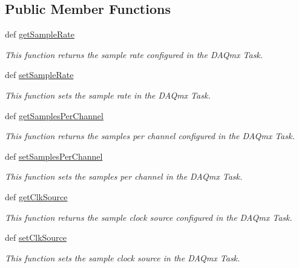 \subsection*{Public Member Functions}
\begin{DoxyCompactItemize}
\item 
def \hyperlink{class_chassis_8git_1_1_digital_output_1_1_digital_output_a514d7da1f494d60c8abc2591662de4f9}{get\-Sample\-Rate}
\begin{DoxyCompactList}\small\item\em This function returns the sample rate configured in the D\-A\-Qmx Task. \end{DoxyCompactList}\item 
def \hyperlink{class_chassis_8git_1_1_digital_output_1_1_digital_output_aedacbf4ed01d8c5ce2d33fb807c19859}{set\-Sample\-Rate}
\begin{DoxyCompactList}\small\item\em This function sets the sample rate in the D\-A\-Qmx Task. \end{DoxyCompactList}\item 
def \hyperlink{class_chassis_8git_1_1_digital_output_1_1_digital_output_a9dabf4d6ff1f1f59e7829efea80a2512}{get\-Samples\-Per\-Channel}
\begin{DoxyCompactList}\small\item\em This function returns the samples per channel configured in the D\-A\-Qmx Task. \end{DoxyCompactList}\item 
def \hyperlink{class_chassis_8git_1_1_digital_output_1_1_digital_output_ac3f88d2f34642621ba2d485174e8e3ad}{set\-Samples\-Per\-Channel}
\begin{DoxyCompactList}\small\item\em This function sets the samples per channel in the D\-A\-Qmx Task. \end{DoxyCompactList}\item 
def \hyperlink{class_chassis_8git_1_1_digital_output_1_1_digital_output_acc51d4045f6c8cbf5825dc4cf1dfc459}{get\-Clk\-Source}
\begin{DoxyCompactList}\small\item\em This function returns the sample clock source configured in the D\-A\-Qmx Task. \end{DoxyCompactList}\item 
def \hyperlink{class_chassis_8git_1_1_digital_output_1_1_digital_output_aa188b505b8d9d68fee45180cda9b66e5}{set\-Clk\-Source}
\begin{DoxyCompactList}\small\item\em This function sets the sample clock source in the D\-A\-Qmx Task. \end{DoxyCompactList}\item 

\end{DoxyCompactItemize}
